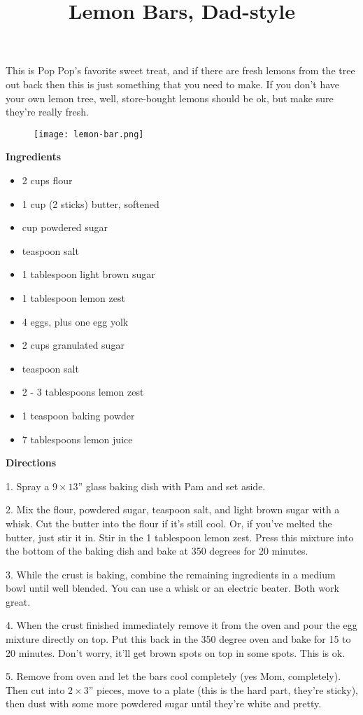 \documentclass{article}
\title{Lemon Bars, Dad-style}
\begin{document}
This is Pop Pop's favorite sweet treat, and if there are fresh lemons from the tree out
back then this is just something that you need to make. If you don't have your own
lemon tree, well, store-bought lemons should be ok, but make sure they're really fresh.

\begin{figure}
      \centering
      \texttt{[image: lemon-bar.png]}
\end{figure}

\bigskip

\textbf{Ingredients}

\begin{multicols}{2}

      \begin{itemize}
            \item 2 cups flour
            \item 1 cup (2 sticks) butter, softened
            \item {} cup powdered sugar
            \item {} teaspoon salt
            \item 1 tablespoon light brown sugar
            \item 1 tablespoon lemon zest

                  \columnbreak

            \item 4 eggs, plus one egg yolk
            \item 2 cups granulated sugar
            \item {} teaspoon salt
            \item 2 - 3 tablespoons lemon zest
            \item 1 teaspoon baking powder
            \item 7 tablespoons lemon juice
      \end{itemize}

\end{multicols}

\textbf{Directions}

1. Spray a $9\times13$'' glass baking dish with Pam and set aside.

2. Mix the flour, powdered sugar,  teaspoon salt, and light brown sugar
with a whisk. Cut the butter into the flour if it's still cool. Or, if you've melted
the butter, just stir it in. Stir in the 1 tablespoon lemon zest. Press this mixture
into the bottom of the baking dish and bake at 350 degrees for 20 minutes.

3. While the crust is baking, combine the remaining ingredients in a medium bowl until
well blended. You can use a whisk or an electric beater. Both work great.

4. When the crust finished immediately remove it from the oven and pour the egg mixture
directly on top. Put this back in the 350 degree oven and bake for 15 to 20 minutes. Don't
worry, it'll get brown spots on top in some spots. This is ok.

5. Remove from oven and let the bars cool completely (yes Mom, completely). Then cut into
$2\times3$'' pieces, move to a plate (this is the hard part, they're sticky), then dust
with some more powdered sugar until they're white and pretty.
\end{document}
